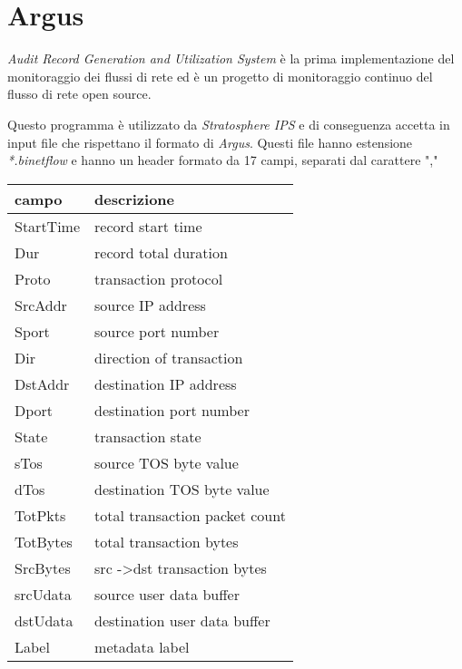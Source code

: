 \documentclass[../main.tex]{subfiles}
\begin{document}
\section{Argus}

\textit{Audit Record Generation and Utilization System} è la prima implementazione del monitoraggio dei flussi di rete ed è un progetto di monitoraggio continuo del flusso di rete open source. \newline

Questo programma è utilizzato da \textit{Stratosphere IPS} e di conseguenza accetta in input file che rispettano il formato di \textit{Argus}. Questi file hanno estensione \textit{*.binetflow} e hanno un header formato da 17 campi, separati dal carattere ","
\begin{table}[H]
\begin{tabular}{|l|l|}
\hline
\textbf{campo} & \textbf{descrizione}                    \\ \hline
StartTime      & record start time                       \\ \hline
Dur            & record total duration                   \\ \hline
Proto          & transaction protocol                    \\ \hline
SrcAddr        & source IP address                       \\ \hline
Sport          & source port number                      \\ \hline
Dir            & direction of transaction                \\ \hline
DstAddr        & destination IP address                  \\ \hline
Dport          & destination port number                 \\ \hline
State          & transaction state                       \\ \hline
sTos           & source TOS byte value                   \\ \hline
dTos           & destination TOS byte value              \\ \hline
TotPkts        & total transaction packet count          \\ \hline
TotBytes       & total transaction bytes                 \\ \hline
SrcBytes       & src -\textgreater dst transaction bytes \\ \hline
srcUdata       & source user data buffer                 \\ \hline
dstUdata       & destination user data buffer            \\ \hline
Label          & metadata label                          \\ \hline
\end{tabular}
\end{table}
\end{document}
